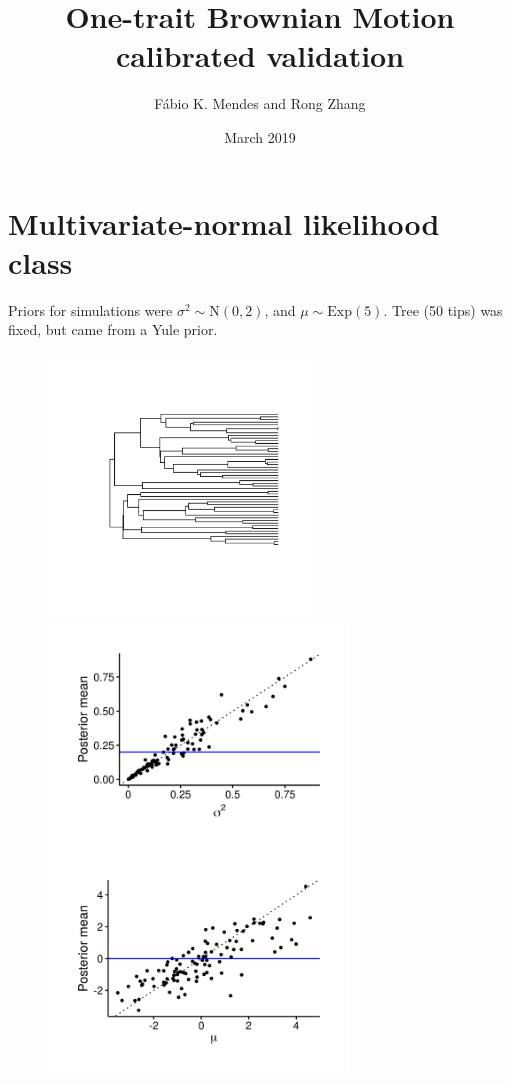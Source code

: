 \documentclass{article}
\title{One-trait Brownian Motion calibrated validation}
\author{F\'{a}bio K. Mendes and Rong Zhang}
\date{March 2019}
\begin{document}
\maketitle

\newpage

\section{Multivariate-normal likelihood class}

Priors for simulations were $\sigma^2 \sim \text{N}(0, 2)$, and $\mu \sim \text{Exp}(5)$. Tree (50 tips) was fixed, but came from a Yule prior.

\begin{figure}[!ht]
  \begin{minipage}[c]{.4\textwidth}
    \centering
    \includegraphics[width=7cm]{../BMMVN_ultra_tree.png}
  \end{minipage}
  \hfill
  \begin{minipage}{.5\textwidth}
    \centering
    \includegraphics[width=8cm]{../BMMVN_ultra_graphs.png}
  \end{minipage}
\end{figure}
\end{document}
